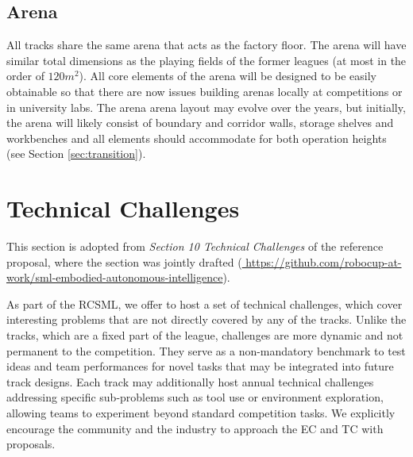 \documentclass[letterpaper, 11pt]{extarticle}
\begin{document}
\subsection{Arena}
All tracks share the same arena that acts as the factory floor.
The arena will have similar total dimensions as the playing fields of the former leagues (at most in the order of $120m^2$).
All core elements of the arena will be designed to be easily obtainable so that there are now issues building arenas locally at competitions or in university labs.
The arena arena layout may evolve over the years, but initially, the arena will likely consist of boundary and corridor walls, storage shelves and workbenches and all elements should accommodate for both operation heights (see Section \ref{sec:transition}).




\section{Technical Challenges}
\label{sec:challenges}
\begin{tcolorbox}[disclaimerbox, title=Disclaimer]
This section is adopted from \emph{Section 10 Technical Challenges} of the reference proposal, where the section was jointly drafted (\url{ https://github.com/robocup-at-work/sml-embodied-autonomous-intelligence}).
\end{tcolorbox}
As part of the RCSML, we offer to host a set of technical challenges, which cover interesting problems that are not directly covered by any of the tracks. Unlike the tracks, which are a fixed part of the league, challenges are more dynamic and not permanent to the competition. They serve as a non-mandatory benchmark to test ideas and team performances for novel tasks that may be integrated into future track designs.
Each track may additionally host annual technical challenges addressing specific sub-problems such as tool use or environment exploration, allowing teams to experiment beyond standard competition tasks.
We explicitly encourage the community and the industry to approach the EC and TC with proposals.
\end{document}
